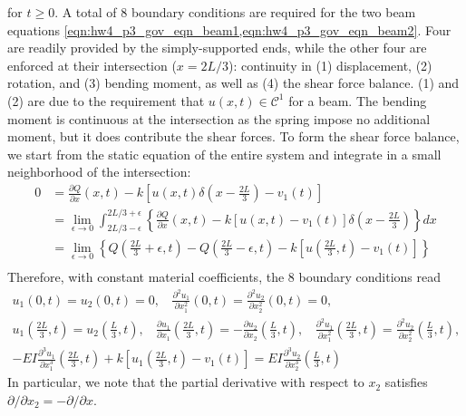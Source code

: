 for $t \geq 0$. 
A total of 8 boundary conditions are required for the two beam equations \cref{eqn:hw4_p3_gov_eqn_beam1,eqn:hw4_p3_gov_eqn_beam2}. 
Four are readily provided by the simply-supported ends, while the other four are enforced at their intersection ($x = 2L/3$): continuity in (1) displacement, (2) rotation, and (3) bending moment, as well as (4) the shear force balance.
(1) and (2) are due to the requirement that $u(x, t) \in \mathcal{C}^1$ for a beam. 
The bending moment is continuous at the intersection as the spring impose no additional moment, but it does contribute the shear forces.  
To form the shear force balance, we start from the static equation of the entire system and integrate in a small neighborhood of the intersection:
\begin{equation}
\begin{aligned}
    0 &= \frac{\partial Q}{\partial x}(x, t) - k\left[u\left(x, t\right) \delta\left(x - \frac{2L}{3}\right) - v_1(t)\right] \\
    &= \lim_{\epsilon\rightarrow 0} \int_{2L/3-\epsilon}^{2L/3+\epsilon} \left\{ \frac{\partial Q}{\partial x}(x, t) - k\left[u\left(x, t\right)  - v_1(t)\right]\delta\left(x - \frac{2L}{3}\right)\right\} dx \\
    &= \lim_{\epsilon\rightarrow 0} \left\{Q\left(\frac{2L}{3}+\epsilon, t\right) - Q\left(\frac{2L}{3}-\epsilon, t\right) - k\left[u\left(\frac{2L}{3}, t\right) - v_1(t)\right]\right\} \\
\end{aligned}
\end{equation}
Therefore, with constant material coefficients, the 8 boundary conditions read 
\begin{equation}\label{eqn:hw4_p3_bc}
\begin{gathered}
    u_1(0, t) = u_2(0, t) = 0, ~~~~ \frac{\partial^2 u_1}{\partial x_1^2}(0, t) = \frac{\partial^2 u_2}{\partial x_2^2}(0, t) = 0, \\
    u_1\left(\frac{2L}{3}, t\right) = u_2\left(\frac{L}{3}, t\right), ~~~~ \frac{\partial u_1}{\partial x_1}\left(\frac{2L}{3}, t\right) = -\frac{\partial u_2}{\partial x_2}\left(\frac{L}{3}, t\right), ~~~~ \frac{\partial^2 u_1}{\partial x_1^2}\left(\frac{2L}{3}, t\right) = \frac{\partial^2 u_2}{\partial x_2^2}\left(\frac{L}{3}, t\right), \\
    -EI\frac{\partial^3 u_1}{\partial x_1^3}\left(\frac{2L}{3}, t\right) + k\left[u_1\left(\frac{2L}{3}, t\right) - v_1(t) \right] = EI\frac{\partial^3 u_2}{\partial x_2^3}\left(\frac{L}{3}, t\right)
\end{gathered}
\end{equation}
In particular, we note that the partial derivative with respect to $x_2$ satisfies $\partial / \partial x_2 = - \partial/\partial x$.

